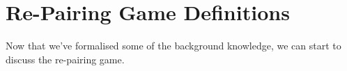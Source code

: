 \section{Re-Pairing Game Definitions}
Now that we've formalised some of the background knowledge, we can start to discuss the re-pairing game. 




